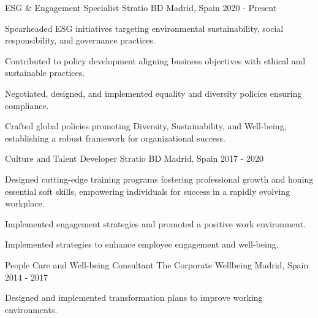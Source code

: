 

\begin{cventries}

  \cventry
    {ESG \& Engagement Specialist} %
    {Stratio BD} %
    {Madrid, Spain} %
    {2020 - Present} %
    {
      \begin{cvitems} %
        \item {Spearheaded ESG initiatives targeting environmental sustainability, social responsibility, and governance practices.}
        \item {Contributed to policy development aligning business objectives with ethical and sustainable practices.}
        \item {Negotiated, designed, and implemented equality and diversity policies ensuring compliance.}
        \item {Crafted global policies promoting Diversity, Sustainability, and Well-being, establishing a robust framework for organizational success.}
      \end{cvitems}
    }

   \cventry
    {Culture and Talent Developer} %
    {Stratio BD} %
    {Madrid, Spain} %
    {2017 - 2020} %
    {
      \begin{cvitems} %
        \item {Designed cutting-edge training programs fostering professional growth and honing essential soft skills, empowering individuals for success in a rapidly evolving workplace.}
        \item {Implemented engagement strategies and promoted a positive work environment.}
        \item {Implemented strategies to enhance employee engagement and well-being.}
      \end{cvitems}
    }

   \cventry
    {People Care and Well-being Consultant} %
    {The Corporate Wellbeing} %
    {Madrid, Spain} %
    {2014 - 2017} %
    {
      \begin{cvitems} %
        \item {Designed and implemented transformation plans to improve working environments.}
      \end{cvitems}
    }



\end{cventries}
